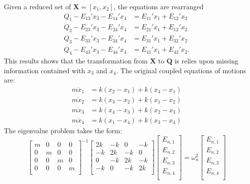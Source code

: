 Given a reduced set of $\bm{X}= [x_1,x_2]$, the equations are rearranged
\begin{equation}
\begin{split}
Q_1-E_{13}'x_3-E_{14}'x_4&= E_{11}'x_1 + E_{12}'x_2\\
Q_2-E_{23}'x_3-E_{24}'x_4&= E_{21}'x_1 + E_{12}'x_2\\
Q_3-E_{33}'x_3-E_{34}'x_4&= E_{31}'x_1 + E_{32}'x_2\\
Q_4-E_{43}'x_3-E_{44}'x_4&= E_{41}'x_1 + E_{42}'x_2.
\end{split}
\end{equation}
This results shows that the transformation from $\bm{X}$ to $\bm{Q}$ is relies upon missing information contained with $x_3$ and $x_4$. The original coupled equations of motions are:
\begin{align}
m\ddot{x}_1&=k(x_2-x_1)+k(x_4-x_1)\\
m\ddot{x}_2&=k(x_3-x_2)+k(x_1-x_2)\\
m\ddot{x}_3&=k(x_4-x_3)+k(x_2-x_3)\\
m\ddot{x}_4&=k(x_1-x_4)+k(x_3-x_4)
\end{align}
The eigenvalue problem takes the form:
\[
\begin{bmatrix}
   m & 0 & 0 & 0 \\
   0 & m & 0 & 0 \\
   0 & 0 & m & 0 \\
   0 & 0 & 0 & m \\
\end{bmatrix}^{-1}
\begin{bmatrix}
   2k & -k & 0 & -k \\
   -k & 2k & -k & 0 \\
   0 & -k & 2k & -k \\
   -k & 0 & -k & 2k \\
\end{bmatrix}
\begin{bmatrix}
   E_{n,1} \\
   E_{n,2} \\
   E_{n,3} \\
   E_{n,4} \\
\end{bmatrix}
=\omega^2_n
\begin{bmatrix}
   E_{n,1} \\
   E_{n,2} \\
   E_{n,3} \\
   E_{n,4} \\
\end{bmatrix}
\]
